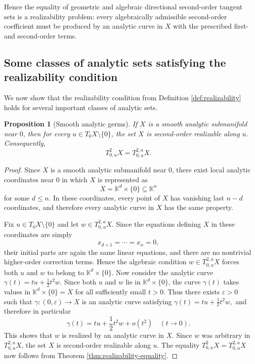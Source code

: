 \documentclass[10pt,reqno]{amsart}
\theoremstyle{break-italic}
\theoremstyle{break-italic}
\theoremstyle{break-italic}
\theoremstyle{break-italic}
\theoremstyle{break-italic}
\theoremstyle{break-italic}
\theoremstyle{break-italic}
\theoremstyle{break-italic}
\newtheorem{Proposition}[satz]{Proposition}
\theoremstyle{break-roman}
\theoremstyle{standard}
\theoremstyle{varthm-roman}
\theoremstyle{varthm-italic}
\theoremstyle{varthm-roman-break}
\theoremstyle{varthm-italic-break}
\theoremstyle{varthm-roman-no-punctuation}
\theoremstyle{varthm-italic-no-punctuation}
\numberwithin{equation}{section}
\begin{document}
Hence the equality of geometric and algebraic directional second-order tangent
sets is a realizability problem: every algebraically admissible second-order
coefficient must be produced by an analytic curve in $X$ with the prescribed
first- and second-order terms.

\subsection{Some classes of analytic sets satisfying the realizability condition}

We now show that the realizability condition from Definition
\ref{def:realizability} holds for several important classes of analytic sets.

\begin{Proposition}[Smooth analytic germs]\label{prop:smooth-realizable}
If $X$ is a smooth analytic submanifold near $0$, then for every
$u\in T_0X\setminus\{0\}$, the set $X$ is second-order realizable along $u$.
Consequently,
\[
T^2_{0,u}X=T^{2,a}_{0,u}X.
\]
\end{Proposition}

\begin{proof}
Since $X$ is a smooth analytic submanifold near $0$, there exist local analytic coordinates near $0$ in which $X$ is
represented as
\[
X=\mathbb K^d\times\{0\}\subseteq \mathbb K^n
\]
for some $d\le n$. In these coordinates, every point of $X$ has vanishing last
$n-d$ coordinates, and therefore every analytic curve in $X$ has the same
property.

Fix $u\in T_0X\setminus\{0\}$ and let $w\in T^{2,a}_{0,u}X$. Since the equations
defining $X$ in these coordinates are simply
\[
x_{d+1}=\cdots=x_n=0,
\]
their initial parts are again the same linear equations, and there are no
nontrivial higher-order correction terms. Hence the algebraic condition
$w\in T^{2,a}_{0,u}X$ forces both $u$ and $w$ to belong to
\(
\mathbb K^d\times\{0\}.
\)
Now consider the analytic curve
\(
\gamma(t)=tu+\frac12 t^2w.
\)
Since both $u$ and $w$ lie in $\mathbb K^d\times\{0\}$, the curve $\gamma(t)$
takes values in $\mathbb K^d\times\{0\}=X$ for all sufficiently small $t>0$.
Thus there exists $\varepsilon>0$ such that
\(
\gamma:(0,\varepsilon)\to X
\)
is an analytic curve satisfying
\(
\gamma(t)=tu+\frac12 t^2w,
\)
and therefore in particular
\[
\gamma(t)=tu+\frac12 t^2w+o(t^2)
\quad (t\to 0).
\]
This shows that $w$ is realized by an analytic curve in $X$. Since $w$ was
arbitrary in $T^{2,a}_{0,u}X$, the set $X$ is second-order realizable along $u$.
The equality
\(
T^2_{0,u}X=T^{2,a}_{0,u}X
\)
now follows from Theorem \ref{thm:realizability-equality}.
\end{proof}
\end{document}
